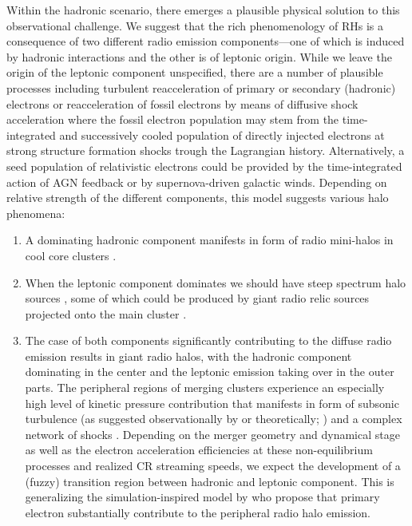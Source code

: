 \documentclass[useAMS,usenatbib]{mn2e}
\begin{document}
Within the hadronic scenario, there emerges a plausible physical solution to
this observational challenge. We suggest that the rich phenomenology of RHs is a
consequence of two different radio emission components---one of which is induced
by hadronic interactions and the other is of leptonic origin. While we leave the
origin of the leptonic component unspecified, there are a number of plausible
processes including turbulent reacceleration of primary or secondary (hadronic)
electrons \citep{2010arXiv1008.0184B} or reacceleration of fossil electrons by
means of diffusive shock acceleration \citep{kang11,kang12,pinzke13} where the
fossil electron population may stem from the time-integrated and successively
cooled population of directly injected electrons at strong structure formation
shocks trough the Lagrangian history. Alternatively, a seed population of
relativistic electrons could be provided by the time-integrated action of AGN
feedback or by supernova-driven galactic winds. Depending on relative strength of
the different components, this model suggests various halo phenomena:
\begin{enumerate}
\item A dominating hadronic component  manifests in form of radio mini-halos in
  cool core clusters \citep{2004A&A...413...17P}.
\item When the leptonic component dominates we should have steep spectrum halo
  sources \citep[such as A520,][]{2008Natur.455..944B}, some of which could be
  produced by giant radio relic sources projected onto the main cluster
  \citep{2012arXiv1211.3122S}.
\item The case of both components significantly contributing to the diffuse
  radio emission results in giant radio halos, with the hadronic component
  dominating in the center and the leptonic emission taking over in the outer
  parts. The peripheral regions of merging clusters experience an especially
  high level of kinetic pressure contribution \citep{2009ApJ...705.1129L,
    2012ApJ...758...74B} that manifests in form of subsonic turbulence (as
  suggested observationally by \citet{2004A&A...426..387S} or theoretically;
  \citet{2006MNRAS.366.1437S,2005MNRAS.364..753D, 2008Sci...320..909R}) and a
  complex network of shocks \citep{2003ApJ...593..599R, 2006MNRAS.367..113P,
    2008MNRAS.385.1211P, 2008ApJ...689.1063S, 2009MNRAS.395.1333V}. Depending on
  the merger geometry and dynamical stage as well as the electron acceleration
  efficiencies at these non-equilibrium processes and realized CR streaming
  speeds, we expect the development of a (fuzzy) transition region between
  hadronic and leptonic component. This is generalizing the simulation-inspired
  model by \cite{2008MNRAS.385.1211P} who propose that primary electron
  substantially contribute to the peripheral radio halo emission.
\end{enumerate}
\end{document}
